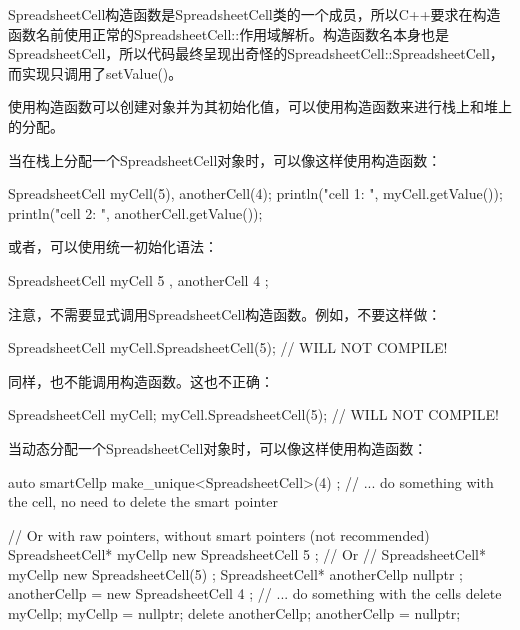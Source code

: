 SpreadsheetCell构造函数是SpreadsheetCell类的一个成员，所以C++要求在构造函数名前使用正常的SpreadsheetCell::作用域解析。构造函数名本身也是SpreadsheetCell，所以代码最终呈现出奇怪的SpreadsheetCell::SpreadsheetCell，而实现只调用了setValue()。


使用构造函数可以创建对象并为其初始化值，可以使用构造函数来进行栈上和堆上的分配。


当在栈上分配一个SpreadsheetCell对象时，可以像这样使用构造函数：

\begin{cpp}
SpreadsheetCell myCell(5), anotherCell(4);
println("cell 1: {}", myCell.getValue());
println("cell 2: {}", anotherCell.getValue());
\end{cpp}

或者，可以使用统一初始化语法：

\begin{cpp}
SpreadsheetCell myCell { 5 }, anotherCell { 4 };
\end{cpp}

注意，不需要显式调用SpreadsheetCell构造函数。例如，不要这样做：

\begin{cpp}
SpreadsheetCell myCell.SpreadsheetCell(5); // WILL NOT COMPILE!
\end{cpp}

同样，也不能调用构造函数。这也不正确：

\begin{cpp}
SpreadsheetCell myCell;
myCell.SpreadsheetCell(5); // WILL NOT COMPILE!
\end{cpp}


当动态分配一个SpreadsheetCell对象时，可以像这样使用构造函数：

\begin{cpp}
auto smartCellp { make_unique<SpreadsheetCell>(4) };
// ... do something with the cell, no need to delete the smart pointer

// Or with raw pointers, without smart pointers (not recommended)
SpreadsheetCell* myCellp { new SpreadsheetCell { 5 } };
// Or
// SpreadsheetCell* myCellp{ new SpreadsheetCell(5) };
SpreadsheetCell* anotherCellp { nullptr };
anotherCellp = new SpreadsheetCell { 4 };
// ... do something with the cells
delete myCellp; myCellp = nullptr;
delete anotherCellp; anotherCellp = nullptr;
\end{cpp}


